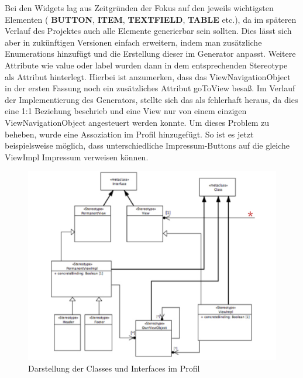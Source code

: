 Bei den Widgets lag aus Zeitgründen der Fokus auf den jeweils wichtigsten Elementen ( \textbf{BUTTON},  \textbf{ITEM},  \textbf{TEXTFIELD},  \textbf{TABLE} etc.), da im späteren Verlauf des Projektes auch alle Elemente generierbar sein sollten. Dies lässt sich aber in zukünftigen Versionen einfach erweitern, indem man zusätzliche Enumerations hinzufügt und die Erstellung dieser im Generator anpasst. 
Weitere Attribute wie value oder label wurden dann in dem entsprechenden Stereotype als Attribut hinterlegt.
Hierbei ist anzumerken, dass das ViewNavigationObject in der ersten Fassung noch ein zusätzliches Attribut goToView besaß. Im Verlauf der Implementierung des Generators, stellte sich das als fehlerhaft heraus, da dies eine 1:1 Beziehung beschrieb und eine View nur von einem einzigen ViewNavigationObject angesteuert werden konnte. Um dieses Problem zu beheben, wurde eine Assoziation im Profil hinzugefügt. So ist es jetzt beispielsweise möglich, dass unterschiedliche Impressum-Buttons auf die gleiche ViewImpl Impressum verweisen können. \\
\begin{figure}[htbp]
\begin{center}
\includegraphics[width=\textwidth]{./img/ProfilClass.pdf}
\caption{Darstellung der Classes und Interfaces im Profil}\label{Fig:UMLProfil}
\end{center}
\end{figure}\\

